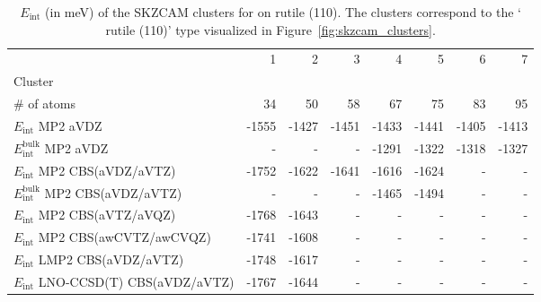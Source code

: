 \begin{table}
\caption{\label{tab:system_eint_r-tio2_ch3oh}$E_\textrm{int}$ (in meV) of the SKZCAM clusters for  on  rutile (110). The clusters correspond to the ` rutile (110)' type visualized in Figure~\ref{fig:skzcam_clusters}.}
\begin{adjustbox}{center,max width=1.4\textwidth}
\begin{tabular}{lrrrrrrr}
\toprule
 & 1 & 2 & 3 & 4 & 5 & 6 & 7 \\ 
Cluster &  &  &  &  &  &  &  \\
\midrule
\# of atoms & 34 & 50 & 58 & 67 & 75 & 83 & 95 \\
$E_\textrm{int}$ MP2 aVDZ & -1555 & -1427 & -1451 & -1433 & -1441 & -1405 & -1413 \\
$E_\textrm{int}^\textrm{bulk}$ MP2 aVDZ & - & - & - & -1291 & -1322 & -1318 & -1327 \\
$E_\textrm{int}$ MP2 CBS(aVDZ/aVTZ) & -1752 & -1622 & -1641 & -1616 & -1624 & - & - \\
$E_\textrm{int}^\textrm{bulk}$ MP2 CBS(aVDZ/aVTZ) & - & - & - & -1465 & -1494 & - & - \\
$E_\textrm{int}$ MP2 CBS(aVTZ/aVQZ) & -1768 & -1643 & - & - & - & - & - \\
$E_\textrm{int}$ MP2 CBS(awCVTZ/awCVQZ) & -1741 & -1608 & - & - & - & - & - \\
$E_\textrm{int}$ LMP2 CBS(aVDZ/aVTZ) & -1748 & -1617 & - & - & - & - & - \\
$E_\textrm{int}$ LNO-CCSD(T) CBS(aVDZ/aVTZ) & -1767 & -1644 & - & - & - & - & - \\
\bottomrule
\end{tabular}
\end{adjustbox}
\end{table}

